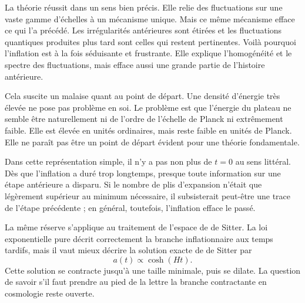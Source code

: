 La théorie réussit dans un sens bien précis. Elle relie des fluctuations sur une vaste gamme d’échelles à un mécanisme unique. Mais ce même mécanisme efface ce qui l’a précédé. Les irrégularités antérieures sont étirées et les fluctuations quantiques produites plus tard sont celles qui restent pertinentes. Voilà pourquoi l’inflation est à la fois séduisante et frustrante. Elle explique l’homogénéité et le spectre des fluctuations, mais efface aussi une grande partie de l’histoire antérieure.

Cela suscite un malaise quant au point de départ. Une densité d’énergie très élevée ne pose pas problème en soi. Le problème est que l’énergie du plateau ne semble être naturellement ni de l’ordre de l’échelle de Planck ni extrêmement faible. Elle est élevée en unités ordinaires, mais reste faible en unités de Planck. Elle ne paraît pas être un point de départ évident pour une théorie fondamentale.

Dans cette représentation simple, il n’y a pas non plus de \(t=0\) au sens littéral. Dès que l’inflation a duré trop longtemps, presque toute information sur une étape antérieure a disparu. Si le nombre de plis d’expansion n’était que légèrement supérieur au minimum nécessaire, il subsisterait peut-être une trace de l’étape précédente ; en général, toutefois, l’inflation efface le passé.

La même réserve s’applique au traitement de l’espace de de Sitter. La loi exponentielle pure décrit correctement la branche inflationnaire aux temps tardifs, mais il vaut mieux décrire la solution exacte de de Sitter par
\begin{equation}
a(t)\propto \cosh(Ht).
\end{equation}
Cette solution se contracte jusqu’à une taille minimale, puis se dilate. La question de savoir s’il faut prendre au pied de la lettre la branche contractante en cosmologie reste ouverte.

\begin{classroomqa}
\end{classroomqa}

